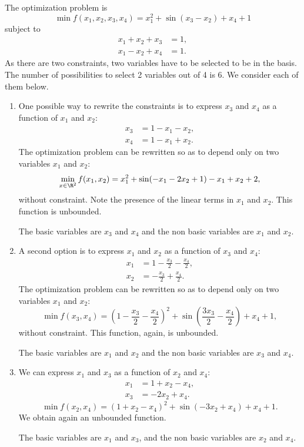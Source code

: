 
 The optimization problem is
\[
\min f(x_1,x_2,x_3,x_4)=x_1^2+\sin(x_3-x_2)+x_4+1
\]
subject to
\[
\begin{aligned}
  x_1+x_2+x_3 & =1, \\
  x_1-x_2+x_4 &=1.
\end{aligned}
\]
As there are two constraints, two variables have to be selected to be
in the basis. The number of possibilities to select 2 variables out of
4 is 6. We consider each of them below. 
\begin{enumerate}
\item One possible way to rewrite the constraints is to express $x_3$
  and $x_4$ as a function of $x_1$ and $x_2$:
  \[
  \begin{aligned}
    x_3 &=1-x_1-x_2,\\
    x_4 &=1-x_1+x_2.
  \end{aligned}
  \]
The optimization problem can be rewritten so as to depend only on two variables $x_1$ and $x_2$:
\[
\min_{x \in \R^2} f(x_1,x_2)=x_1^2+\sin(-x_1-2x_2+1)-x_1+x_2+2,
\]
without constraint. Note the presence of the linear terms in $x_1$ and
$x_2$. This function is unbounded. 

The basic variables are $x_3$ and $x_4$ and the non basic variables are $x_1$ and $x_2$.
\item A second option is to express $x_1$ and $x_2$ as a function of
  $x_3$ and $x_4$:
  \[
  \begin{aligned}
    x_1 &=1-\frac{x_3}{2} - \frac{x_4}{2},\\
    x_2 &=-\frac{x_3}{2} + \frac{x_4}{2}.
  \end{aligned}
    \]
The optimization problem can be rewritten so as to depend only on two variables $x_1$ and $x_2$:
\[
\min f(x_3,x_4)=(1-\frac{x_3}{2} - \frac{x_4}{2})^2+\sin(\frac{3x_3}{2} - \frac{x_4}{2})+x_4+1,\]
without constraint. This function, again, is unbounded.

The basic variables are $x_1$ and $x_2$ and the non
basic variables are $x_3$ and $x_4$.
\item We can express $x_1$ and $x_3$ as a function of $x_2$ and $x_4$:
  \begin{align*}
  x_1 & =1 +x_2-x_4, \\
  x_3 & = -2 x_2 + x_4.
  \end{align*}
  \[
  \min f(x_2,x_4)=(1 +x_2-x_4)^2+\sin(-3 x_2 + x_4)+x_4+1.
  \]
  We obtain again an unbounded function.
  
  The basic
variables are $x_1$ and $x_3$, and the non basic variables are $x_2$
and $x_4$.


\end{enumerate}
